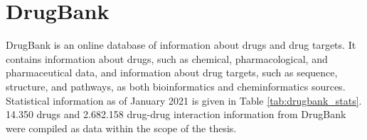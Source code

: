 \section{DrugBank}
DrugBank \cite{wishart2006drugbank, wishart2008drugbank, wishart2018drugbank} is an online database of information about drugs and drug targets. It contains information about drugs, such as chemical, pharmacological, and pharmaceutical data, and information about drug targets, such as sequence, structure, and pathways, as both bioinformatics and cheminformatics sources. Statistical information as of January 2021 is given in Table 
\ref{tab:drugbank_stats}. 14.350 drugs and 2.682.158 drug-drug interaction information from DrugBank were compiled as data within the scope of the thesis.


